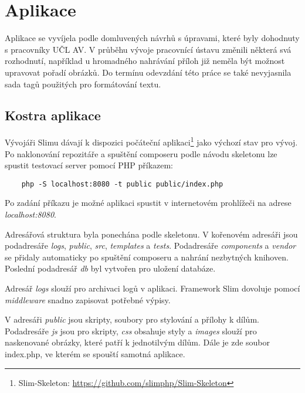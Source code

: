             
            
    \section{Aplikace}
    
        Aplikace se vyvíjela podle domluvených návrhů s úpravami, které byly dohodnuty s pracovníky UČL AV. V průběhu vývoje pracovnící ústavu změnili některá svá rozhodnutí, například u hromadného nahrávání příloh již neměla být možnost upravovat pořadí obrázků. Do termínu odevzdání této práce se také nevyjasnila sada tagů použitých pro formátování textu.
        \subsection{Kostra aplikace}
            Vývojáři Slimu dávají k dispozici počáteční aplikaci\footnote{Slim-Skeleton: \url{https://github.com/slimphp/Slim-Skeleton}} jako výchozí stav pro vývoj. Po naklonování repozitáře a spuštění composeru podle návodu skeletonu lze spustit testovací server pomocí PHP příkazem:
            \begin{lstlisting}
    php -S localhost:8080 -t public public/index.php
            \end{lstlisting}
            Po zadání příkazu je možné aplikaci spustit v internetovém prohlížeči na adrese \textit{localhost:8080}.
            
            Adresářová struktura byla ponechána podle skeletonu. V kořenovém adresáři jsou podadresáře \textit{logs}, \textit{public}, \textit{src}, \textit{templates} a \textit{tests}. Podadresáře \textit{components} a \textit{vendor} se přidaly automaticky po spuštění composeru a nahrání nezbytných knihoven. Poslední podadresář \textit{db} byl vytvořen pro uložení databáze.

            Adresář \textit{logs} slouží pro archivaci logů v aplikaci. Framework Slim dovoluje pomocí \textit{middleware} snadno zapisovat potřebné výpisy.
            
            V adresáři \textit{public} jsou skripty, soubory pro stylování a přílohy k dílům. Podadresáře \textit{js} jsou pro skripty, \textit{css} obsahuje styly a \textit{images} slouží pro naskenované obrázky, které patří k jednotilvým dílům. Dále je zde soubor index.php, ve kterém se spouští samotná aplikace.
            
